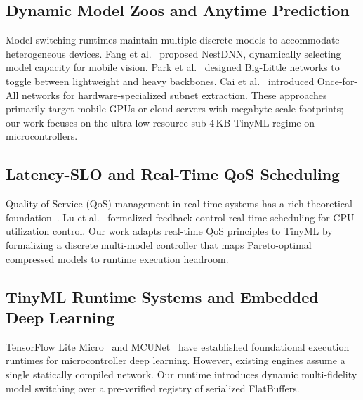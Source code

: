 \documentclass[journal]{IEEEtran}
\begin{document}
\subsection{Dynamic Model Zoos and Anytime Prediction}
Model-switching runtimes maintain multiple discrete models to accommodate heterogeneous devices. Fang et al.~\cite{fang2018nestdnn} proposed NestDNN, dynamically selecting model capacity for mobile vision. Park et al.~\cite{park2019bignas} designed Big-Little networks to toggle between lightweight and heavy backbones. Cai et al.~\cite{cai2020once} introduced Once-for-All networks for hardware-specialized subnet extraction. These approaches primarily target mobile GPUs or cloud servers with megabyte-scale footprints; our work focuses on the ultra-low-resource sub-4\,KB TinyML regime on microcontrollers.

\subsection{Latency-SLO and Real-Time QoS Scheduling}
Quality of Service (QoS) management in real-time systems has a rich theoretical foundation~\cite{liu1973scheduling,abdelzaher2002performance,lu2002feedback}. Lu et al.~\cite{lu2002feedback} formalized feedback control real-time scheduling for CPU utilization control. Our work adapts real-time QoS principles to TinyML by formalizing a discrete multi-model controller that maps Pareto-optimal compressed models to runtime execution headroom.

\subsection{TinyML Runtime Systems and Embedded Deep Learning}
TensorFlow Lite Micro~\cite{david2021tensorflow} and MCUNet~\cite{lin2020mcunet,lin2021mcunetv2} have established foundational execution runtimes for microcontroller deep learning. However, existing engines assume a single statically compiled network. Our runtime introduces dynamic multi-fidelity model switching over a pre-verified registry of serialized FlatBuffers.
\end{document}
